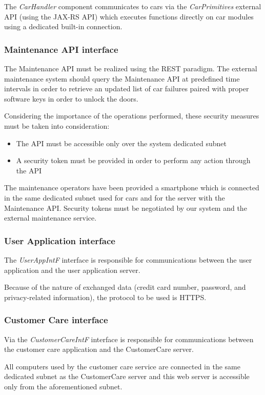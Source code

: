 The \emph{CarHandler} component communicates to cars via the \mbox{\emph{CarPrimitives}} external API (using the JAX-RS API) which executes functions directly on car modules using a dedicated built-in connection.

\subsubsection{Maintenance API interface}
The Maintenance API must be realized using the REST paradigm. The external maintenance system should query the Maintenance API at predefined time intervals in order to retrieve an updated list of car failures paired with proper software keys in order to unlock the doors.

Considering the importance of the operations performed, these security measures must be taken into consideration:
\begin{itemize}
	\item The API must be accessible only over the system dedicated subnet
	\item A security token must be provided in order to perform any action through the API
\end{itemize}
The maintenance operators have been provided a smartphone which is connected in the same dedicated subnet used for cars and for the server with the Maintenance API.
Security tokens must be negotiated by our system and the external maintenance service.

\subsubsection{User Application interface}
The \emph{UserAppIntF} interface is responsible for communications between the user application and the user application server.

Because of the nature of exchanged data (credit card number, password, and privacy-related information), the protocol to be used is HTTPS.

\subsubsection{Customer Care interface}
Via the \emph{CustomerCareIntF} interface is responsible for communications between the customer care application and the CustomerCare server.

All computers used by the customer care service are connected in the same dedicated subnet as the CustomerCare server and this web server is accessible only from the aforementioned subnet. 

